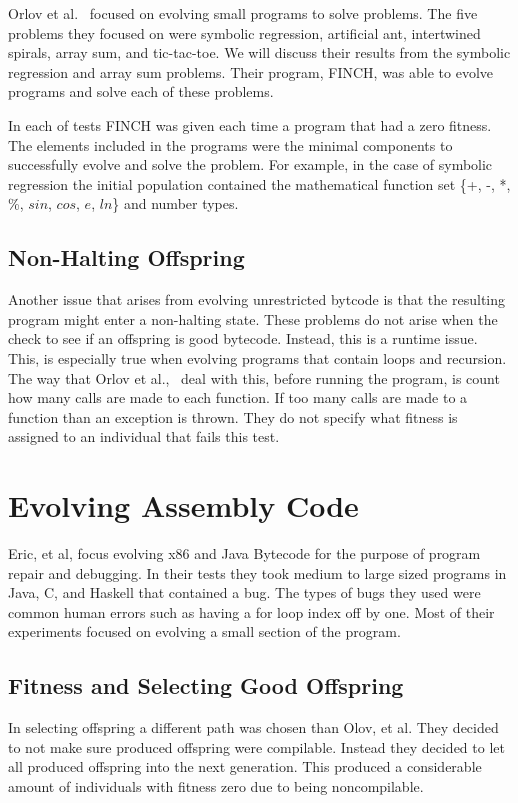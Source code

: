 \documentclass{sig-alternate}
\begin{document}
Orlov et al.~\cite{FINCH:2011} focused on evolving small programs to solve problems. The five problems they focused on were symbolic regression, artificial ant, intertwined spirals, array sum, and tic-tac-toe. We will discuss their results from the symbolic regression and array sum problems. Their program, FINCH, was able to evolve programs and solve each of these problems.

In each of tests FINCH was given each time a program that had a zero fitness. The elements included in the programs were the minimal components to successfully evolve and solve the problem. For example, in the case of symbolic regression the initial population contained the mathematical function set \{+, -, *, \%, $sin$, $cos$, $e$,  $ln$\} and number types.

\subsection{Non-Halting Offspring}
Another issue that arises from evolving unrestricted bytcode is that the resulting program might enter a non-halting state. These problems do not arise when the check to see if an offspring is good bytecode. Instead, this is a runtime issue. This, is especially true when evolving programs that contain loops and recursion.
The way that Orlov et al.,~\cite{FINCH:2011} deal with this, before running the program, is count how many calls are made to each function. If too many calls are made to a function than an exception is thrown. They do not specify what fitness is assigned to an individual that fails this test.






\section{Evolving Assembly Code}
Eric, et al, focus evolving x86 and Java Bytecode for the purpose of program repair and debugging. In their tests they took medium to large sized programs in Java, C, and Haskell that contained a bug. The types of bugs they used were common human errors such as having a for loop index off by one. Most of their experiments focused on evolving a small section of the program.
\subsection{Fitness and Selecting Good Offspring } 
In selecting offspring a different path was chosen than Olov, et al. They decided to not make sure produced offspring were compilable. Instead they decided to let all produced offspring into the next generation. This produced a considerable amount of individuals with fitness zero due to being noncompilable. 
\end{document}
